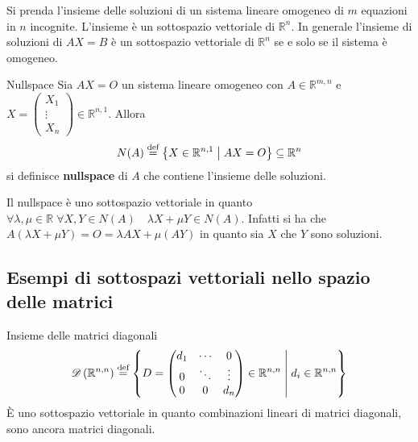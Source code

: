 Si prenda l'insieme delle soluzioni di un sistema lineare omogeneo di $m$ equazioni in
$n$ incognite. L'insieme è un sottospazio vettoriale di $\mathbb{R}^n$. In generale
l'insieme di soluzioni di $AX=B$ è un sottospazio vettoriale di $\mathbb{R}^n$ se e solo
se il sistema è omogeneo.

\begin{Def}{Nullspace}
  Sia $AX=O$ un sistema lineare omogeneo con $A\in\mathbb{R}^{m,n}$ e
  $X=
  \begin{pmatrix}
    X_1\\\vdots\\X_n
  \end{pmatrix}\in\mathbb{R}^{n,1}$. Allora
  \begin{equation*}
    N(A)\bydef \left\{ X\in\mathbb{R}^{n,1}\Setsuchthat AX = O
    \right\}\subseteq\mathbb{R}^n
  \end{equation*}
  si definisce \textbf{nullspace} di $A$ che contiene l'insieme delle soluzioni.
\end{Def}

Il nullspace è uno sottospazio vettoriale in quanto
$\forall\lambda,\mu\in\mathbb{R}\;\forall X,Y\in N(A)\quad \lambda X+\mu Y\in N(A)$.
Infatti si ha che $A(\lambda X+\mu Y) = O = \lambda AX+\mu (AY)$ in quanto sia $X$ che
$Y$ sono soluzioni.

\subsection{Esempi di sottospazi vettoriali nello spazio delle matrici}%
\label{sub:esempi_di_sottospazi_vettoriali_nello_spazio_dell_matrici}

\begin{Def}{Insieme delle matrici diagonali}
  \begin{equation*}
    \mathscr{D}\left( \mathbb{R}^{n,n} \right) \bydef \left\{ D =
      \begin{pmatrix}
        d_1 & \cdots & 0\\
        0 & \ddots & \vdots\\
        0 & 0 & d_n
      \end{pmatrix}\in\mathbb{R}^{n,n}
      \Setsuchthat d_i\in\mathbb{R}^{n,n}
    \right\}
  \end{equation*}
  È uno sottospazio vettoriale in quanto combinazioni lineari di matrici diagonali, sono
  ancora matrici diagonali.
\end{Def}

